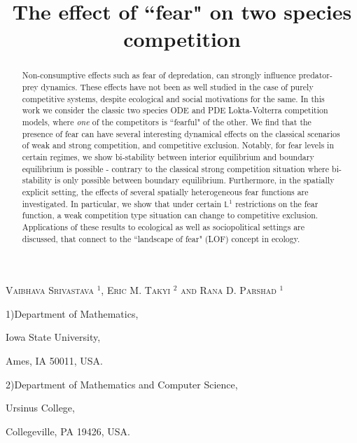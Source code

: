 \documentclass[10pt]{amsart}
\title[Fear effect]
    {The effect of ``fear" on two species competition}
\theoremstyle{definition}
\begin{document}
\maketitle
\centerline{\scshape  Vaibhava Srivastava $^{1}$, Eric M. Takyi $^{2}$ and Rana D. Parshad $^{1}$}
\medskip
{\footnotesize
\centerline{ 1)Department of Mathematics,}
 \centerline{Iowa State University,}
   \centerline{Ames, IA 50011, USA.}
  \medskip
\centerline{ 2)Department of Mathematics and Computer Science,}
 \centerline{Ursinus College,}
   \centerline{Collegeville, PA 19426, USA.}
 
}

%
%
%


\begin{abstract}
Non-consumptive effects such as fear of depredation, can strongly influence predator-prey dynamics. These effects have not been as well studied in the case of purely competitive systems, despite ecological and social motivations for the same. In this work we consider the classic two species ODE and PDE Lokta-Volterra competition models, where \emph{one} of the competitors is ``fearful" of the other. We find that the presence of fear can have several interesting dynamical effects on the classical scenarios of weak and strong competition, and competitive exclusion. Notably, for fear levels in certain regimes, we show bi-stability between interior equilibrium and boundary equilibrium is possible - contrary to the classical strong competition situation where bi-stability is only possible between boundary equilibrium. Furthermore, in the spatially explicit setting, the effects of several spatially heterogeneous fear functions are investigated. 
In particular, we show that under certain $\mathbb{L}^{1}$ restrictions on the fear function, a weak competition type situation can change to competitive exclusion. Applications of these results to ecological as well as sociopolitical settings are discussed, that connect to the ``landscape of fear" (LOF) concept in ecology. 
\end{abstract}
\end{document}
